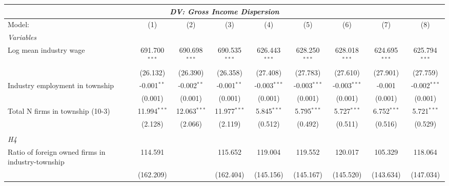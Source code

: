 \begingroup
\centering
\begin{tabular}{lcccccccc}
   \tabularnewline \multicolumn{9}{c}{\textit{DV: Gross Income Dispersion}} \\ \midrule \midrule
   Model:                                                & (1)             & (2)             & (3)             & (4)              & (5)              & (6)              & (7)              & (8)\\  
   \midrule
   \emph{Variables}\\
   Log mean industry wage                                & 691.700$^{***}$ & 690.698$^{***}$ & 690.535$^{***}$ & 626.443$^{***}$  & 628.250$^{***}$  & 628.018$^{***}$  & 624.695$^{***}$  & 625.794$^{***}$\\   
                                                         & (26.132)        & (26.390)        & (26.358)        & (27.408)         & (27.783)         & (27.610)         & (27.901)         & (27.759)\\   
   Industry employment in township                       & -0.001$^{**}$   & -0.002$^{**}$   & -0.001$^{**}$   & -0.003$^{***}$   & -0.003$^{***}$   & -0.003$^{***}$   & -0.001           & -0.002$^{***}$\\   
                                                         & (0.001)         & (0.001)         & (0.001)         & (0.001)          & (0.001)          & (0.001)          & (0.001)          & (0.001)\\   
   Total N firms in township (10-3)                      & 11.994$^{***}$  & 12.063$^{***}$  & 11.977$^{***}$  & 5.845$^{***}$    & 5.795$^{***}$    & 5.727$^{***}$    & 6.752$^{***}$    & 5.721$^{***}$\\   
                                                         & (2.128)         & (2.066)         & (2.119)         & (0.512)          & (0.492)          & (0.511)          & (0.516)          & (0.529)\\   
\hdashline %
\\[0.1ex] %
\emph{H4} \\ 
   Ratio of foreign owned firms in industry-township     & 114.591         &                 & 115.652         & 119.004          & 119.552          & 120.017          & 105.329          & 118.064\\   
                                                         & (162.209)       &                 & (162.404)       & (145.156)        & (145.167)        & (145.520)        & (143.634)        & (147.034)\\   

\end{tabular}
